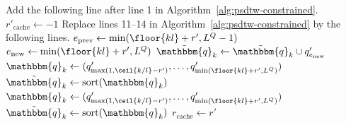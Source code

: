 \begin{algorithm*}[t] %
\caption{Optimize lines 11 to 14 in Algorithm~\ref{alg:psdtw-constrained} by reusing the computed sorted reaches $\tilde{\mathbbm{q}}_k$.}
\label{alg:psdtw-reuse-reaches}
\begin{algorithmic}[1]
\Statex Add the following line after line 1 in Algorithm~\ref{alg:psdtw-constrained}.
\State $r'_{\mathrm{cache}} \gets -1$
\Statex Replace lines 11--14 in Algorithm~\ref{alg:psdtw-constrained} by the following lines.
            \State $e_\mathrm{prev} \gets \min(\floor{kl} + r', L^Q - 1)$
            \State $e_\mathrm{new} \gets \min(\floor{kl} + r', L^Q)$
                \State $\tilde{\mathbbm{q}}_k \gets \tilde{\mathbbm{q}}_k \cup q'_{e_\mathrm{new}}$ 
            \EndIf
        \Else
            \State $\mathbbm{q}_k \gets (q'_{\max(1, \ceil{k/l} - r')}, \ldots, q'_{\min(\floor{kl} + r', L^Q)})$ 
            \State $\tilde{\mathbbm{q}}_k \gets \operatorname{sort}(\mathbbm{q}_k)$
        \EndIf
    \EndFor
\Else
     
        \State $\mathbbm{q}_k \gets (q'_{\max(1, \ceil{k/l} - r')}, \ldots, q'_{\min(\floor{kl} + r', L^Q)})$
        \State $\tilde{\mathbbm{q}}_k \gets \operatorname{sort}(\mathbbm{q}_k)$
    \EndFor
    \State $r_{\mathrm{cache}} \gets r'$
\EndIf
\end{algorithmic}
\end{algorithm*}


